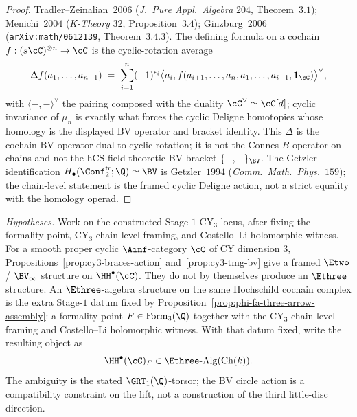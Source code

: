 \begin{proof}
Tradler--Zeinalian~$2006$ (\emph{J.\ Pure Appl.\ Algebra} $204$,
Theorem~$3.1$); Menichi~$2004$ (\emph{K-Theory} $32$,
Proposition~$3.4$); Ginzburg~$2006$ (\texttt{arXiv:math/0612139},
Theorem~$3.4.3$). The defining formula on a cochain
$f:(s\bar\cC)^{\otimes n}\to\cC$ is the cyclic-rotation average
\[
\Delta f(a_1,\ldots,a_{n-1})\;=\;\sum_{i=1}^{n}(-1)^{\epsilon_i}
\bigl\langle a_i,f(a_{i+1},\ldots,a_n,a_1,\ldots,a_{i-1},\mathbf 1_\cC)\bigr\rangle^\vee,
\]
with $\langle-,-\rangle^\vee$ the pairing composed with the duality
$\cC^\vee\simeq\cC[d]$; cyclic invariance of $\mu_n$ is exactly what
forces the cyclic Deligne homotopies whose homology is the displayed BV
operator and bracket identity. This $\Delta$ is the cochain BV operator
dual to cyclic rotation; it is not the Connes $B$ operator on chains and
not the hCS field-theoretic BV bracket $\{-,-\}_{\BV}$. The Getzler identification
$H_\bullet(\Conf_2^{\mathrm{fr}};\Q)\simeq\BV$ is
Getzler~$1994$ (\emph{Comm.\ Math.\ Phys.}~$159$); the chain-level
statement is the framed cyclic Deligne action, not a strict equality
with the homology operad.
\end{proof}

\begin{proposition}
\label{prop:cy3-e3-structure-hochschild}
\noindent\emph{Hypotheses.} Work on the constructed Stage-$1$ CY$_3$
locus, after fixing the formality point, CY$_3$ chain-level framing, and
Costello--Li holomorphic witness.
For a smooth proper cyclic $\Ainf$-category $\cC$ of CY dimension $3$,
Propositions~\ref{prop:cy3-braces-action} and~\ref{prop:cy3-tmg-bv}
give a framed $\Etwo$ / $\BV_\infty$ structure on
$\HH^\bullet(\cC)$. They do not by themselves produce an $\Ethree$
structure. An $\Ethree$-algebra structure on the same Hochschild
cochain complex is the extra Stage-$1$ datum fixed by
Proposition~\ref{prop:phi-fa-three-arrow-assembly}: a formality point
$F\in\mathrm{Form}_3(\Q)$ together with the CY$_3$ chain-level
framing and Costello--Li holomorphic witness. With that datum fixed,
write the resulting object as
\[
 \HH^\bullet(\cC)_F\in\Ethree\text{-}\mathrm{Alg}(\mathrm{Ch}(k)).
\]
The ambiguity is the stated $\GRT_1(\Q)$-torsor; the BV circle action is
a compatibility constraint on the lift, not a construction of the third
little-disc direction.
\end{proposition}

